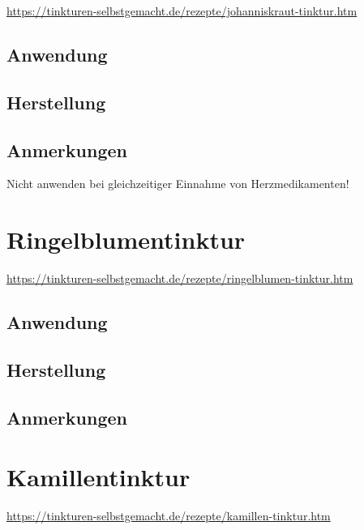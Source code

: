 \cite{tinkturen} 

\url{https://tinkturen-selbstgemacht.de/rezepte/johanniskraut-tinktur.htm}


\subsection{Anwendung}

\subsection{Herstellung}

\subsection{Anmerkungen}

Nicht anwenden bei gleichzeitiger Einnahme von Herzmedikamenten!





\section{Ringelblumentinktur}

\cite{tinkturen}

\url{https://tinkturen-selbstgemacht.de/rezepte/ringelblumen-tinktur.htm}

\subsection{Anwendung}

\subsection{Herstellung}

\subsection{Anmerkungen}






\section{Kamillentinktur}

\cite{tinkturen}

\url{https://tinkturen-selbstgemacht.de/rezepte/kamillen-tinktur.htm}

